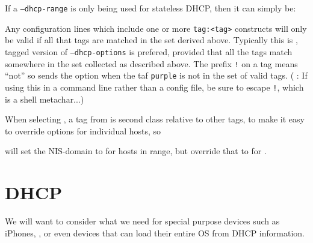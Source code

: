 \documentclass[dvipsnames]{article}
\begin{document}
{{{      If a \texttt{--dhcp-range} is only being used for stateless DHCP, then
      it can simply be:
    }
  }

  Any configuration lines which include one or more \texttt{tag:<tag>}
  constructs will only be valid if all that tags are matched in the set derived
  above. Typically this is , tagged version of
  \texttt{--dhcp-options} is prefered, provided that all the tags match
  somewhere in the set collected as described above. The prefix \texttt{!} on a
  tag means ``not'' so  sends the
  option when the taf \texttt{purple} is not in the set of valid tags.
  ( : If using
  this in a command line rather than a config file, be sure to escape
  \texttt{!}, which is a shell metachar...)

  When selecting , a tag from  is
  second class relative to other tags, to make it easy to override options for
  individual hosts, so

  will set the NIS-domain to  for hosts in range, but override that to
   for .

}

\section{DHCP}
\label{sec:dhcp}

We will want to consider what we need for special purpose devices such as
iPhones, , or even  devices that can load their entire OS from DHCP
information.
\end{document}

